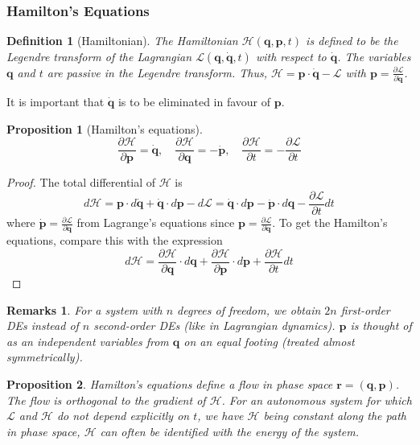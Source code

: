 \documentclass[a4paper]{article}
\newtheorem{remarks}{Remarks}[section]
\theoremstyle{new}
\newtheorem{defi}{Definition}[section]
\newtheorem{prop}{Proposition}[section]
\begin{document}
\subsubsection{Hamilton's Equations}
\begin{defi}[Hamiltonian]
The Hamiltonian $\mathcal{H}(\mathbf{q},\mathbf{p},t)$ is defined to be the Legendre transform of the Lagrangian $\mathcal{L}(\mathbf{q},\mathbf{\dot{q}},t)$ with respect to $\mathbf{\dot{q}}$. The variables $\mathbf{q}$ and $t$ are passive in the Legendre transform. Thus, $\mathcal{H}=\mathbf{p}\cdot\mathbf{\dot{q}}-\mathcal{L}$ with $\mathbf{p}=\frac{\partial\mathcal{L}}{\partial\mathbf{\dot{q}}}$. 
\end{defi}
It is important that $\mathbf{\dot{q}}$ is to be eliminated in favour of $\mathbf{p}$. 
\begin{prop}[Hamilton's equations]
$$\frac{\partial\mathcal{H}}{\partial\mathbf{p}}=\mathbf{\dot{q}},\quad\frac{\partial\mathcal{H}}{\partial\mathbf{q}}=-\mathbf{\dot{p}},\quad\frac{\partial\mathcal{H}}{\partial t}=-\frac{\partial\mathcal{L}}{\partial t}$$
\end{prop}
\begin{proof}
The total differential of $\mathcal{H}$ is
$$d\mathcal{H}=\mathbf{p}\cdot d\mathbf{\dot{q}}+\mathbf{\dot{q}}\cdot d\mathbf{p}-d\mathcal{L}=\mathbf{\dot{q}}\cdot d\mathbf{p}-\mathbf{\dot{p}}\cdot d\mathbf{q}-\frac{\partial\mathcal{L}}{\partial t}dt$$
where $\mathbf{\dot{p}}=\frac{\partial\mathcal{L}}{\partial\mathbf{q}}$ from Lagrange's equations since $\mathbf{p}=\frac{\partial\mathcal{L}}{\partial\mathbf{\dot{q}}}$. To get the Hamilton's equations, compare this with the expression $$d\mathcal{H}=\frac{\partial\mathcal{H}}{\partial\mathbf{q}}\cdot d\mathbf{q}+\frac{\partial\mathcal{H}}{\partial\mathbf{p}}\cdot d\mathbf{p}+\frac{\partial\mathcal{H}}{\partial t}dt$$
\end{proof}
\begin{remarks}
For a system with $n$ degrees of freedom, we obtain $2n$ first-order DEs instead of $n$ second-order DEs (like in Lagrangian dynamics). $\mathbf{p}$ is thought of as an independent variables from $\mathbf{q}$ on an equal footing (treated almost symmetrically).
\end{remarks}
\begin{prop}
Hamilton's equations define a flow in phase space $\mathbf{r}=(\mathbf{q},\mathbf{p})$. The flow is orthogonal to the gradient of $\mathcal{H}$. For an autonomous system for which $\mathcal{L}$ and $\mathcal{H}$ do not depend explicitly on $t$, we have $\mathcal{H}$ being constant along the path in phase space, $\mathcal{H}$ can often be identified with the energy of the system.
\end{prop}
\end{document}
